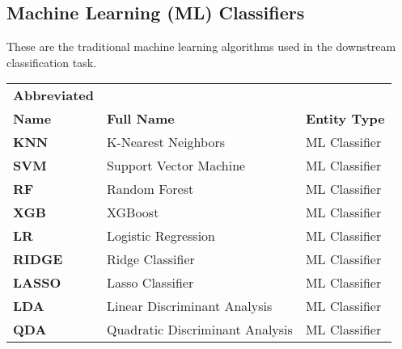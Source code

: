 \documentclass[11pt]{article}
\begin{document}
\subsection*{Machine Learning (ML) Classifiers}
These are the traditional machine learning algorithms used in the downstream classification task.
\begin{table}[h!]
\centering
\begin{tabular}{@{}lll@{}}
\toprule
\textbf{Abbreviated} &                                       &          \\ 
\textbf{Name} & \textbf{Full Name}                                      & \textbf{Entity Type}         \\ \midrule
\textbf{KNN}              & K-Nearest Neighbors                     & ML Classifier        \\
\textbf{SVM}              & Support Vector Machine                  & ML Classifier        \\
\textbf{RF}               & Random Forest                           & ML Classifier        \\
\textbf{XGB}              & XGBoost                                 & ML Classifier        \\
\textbf{LR}               & Logistic Regression                     & ML Classifier        \\
\textbf{RIDGE}            & Ridge Classifier                        & ML Classifier        \\
\textbf{LASSO}            & Lasso Classifier                        & ML Classifier        \\
\textbf{LDA}              & Linear Discriminant Analysis            & ML Classifier        \\
\textbf{QDA}              & Quadratic Discriminant Analysis         & ML Classifier        \\ \bottomrule
\end{tabular}
\end{table}

\newpage
\end{document}
